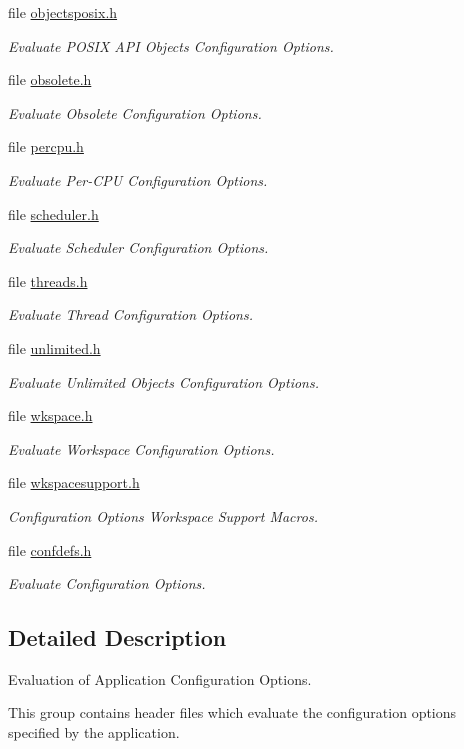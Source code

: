 \begin{DoxyCompactItemize}
file \mbox{\hyperlink{objectsposix_8h}{objectsposix.\+h}}
\begin{DoxyCompactList}\small\item\em Evaluate P\+O\+S\+IX A\+PI Objects Configuration Options. \end{DoxyCompactList}\item 
file \mbox{\hyperlink{obsolete_8h}{obsolete.\+h}}
\begin{DoxyCompactList}\small\item\em Evaluate Obsolete Configuration Options. \end{DoxyCompactList}\item 
file \mbox{\hyperlink{confdefs_2percpu_8h}{percpu.\+h}}
\begin{DoxyCompactList}\small\item\em Evaluate Per-\/\+C\+PU Configuration Options. \end{DoxyCompactList}\item 
file \mbox{\hyperlink{confdefs_2scheduler_8h}{scheduler.\+h}}
\begin{DoxyCompactList}\small\item\em Evaluate Scheduler Configuration Options. \end{DoxyCompactList}\item 
file \mbox{\hyperlink{threads_8h}{threads.\+h}}
\begin{DoxyCompactList}\small\item\em Evaluate Thread Configuration Options. \end{DoxyCompactList}\item 
file \mbox{\hyperlink{unlimited_8h}{unlimited.\+h}}
\begin{DoxyCompactList}\small\item\em Evaluate Unlimited Objects Configuration Options. \end{DoxyCompactList}\item 
file \mbox{\hyperlink{confdefs_2wkspace_8h}{wkspace.\+h}}
\begin{DoxyCompactList}\small\item\em Evaluate Workspace Configuration Options. \end{DoxyCompactList}\item 
file \mbox{\hyperlink{wkspacesupport_8h}{wkspacesupport.\+h}}
\begin{DoxyCompactList}\small\item\em Configuration Options Workspace Support Macros. \end{DoxyCompactList}\item 
file \mbox{\hyperlink{confdefs_8h}{confdefs.\+h}}
\begin{DoxyCompactList}\small\item\em Evaluate Configuration Options. \end{DoxyCompactList}\end{DoxyCompactItemize}


\subsection{Detailed Description}
Evaluation of Application Configuration Options. 

This group contains header files which evaluate the configuration options specified by the application. 